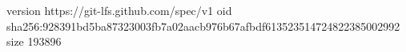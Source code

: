 version https://git-lfs.github.com/spec/v1
oid sha256:928391bd5ba87323003fb7a02aacb976b67afbdf613523514724822385002992
size 193896
